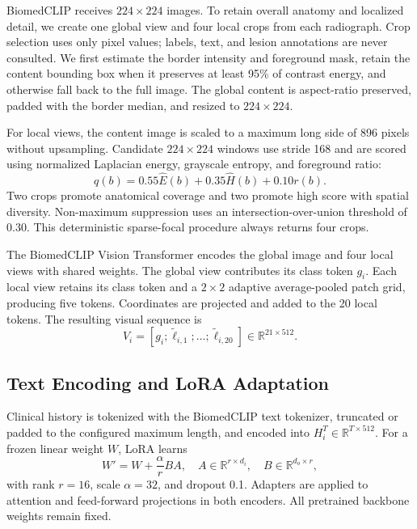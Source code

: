 \documentclass[runningheads]{llncs}
\begin{document}
BiomedCLIP receives $224\times224$ images. To retain overall anatomy and localized detail, we create one global view and four local crops from each radiograph. Crop selection uses only pixel values; labels, text, and lesion annotations are never consulted. We first estimate the border intensity and foreground mask, retain the content bounding box when it preserves at least 95\% of contrast energy, and otherwise fall back to the full image. The global content is aspect-ratio preserved, padded with the border median, and resized to $224\times224$.

For local views, the content image is scaled to a maximum long side of 896 pixels without upsampling. Candidate $224\times224$ windows use stride 168 and are scored using normalized Laplacian energy, grayscale entropy, and foreground ratio:
\begin{equation}
q(b)=0.55\widehat{E}(b)+0.35\widehat{H}(b)+0.10r(b).
\end{equation}
Two crops promote anatomical coverage and two promote high score with spatial diversity. Non-maximum suppression uses an intersection-over-union threshold of 0.30. This deterministic sparse-focal procedure always returns four crops.

The BiomedCLIP Vision Transformer \cite{Dosovitskiy2021ViT,BiomedCLIP} encodes the global image and four local views with shared weights. The global view contributes its class token $g_i$. Each local view retains its class token and a $2\times2$ adaptive average-pooled patch grid, producing five tokens. Coordinates are projected and added to the 20 local tokens. The resulting visual sequence is
\begin{equation}
V_i=[g_i;\tilde{\ell}_{i,1};\ldots;\tilde{\ell}_{i,20}]\in\mathbb{R}^{21\times512}.
\end{equation}

\subsection{Text Encoding and LoRA Adaptation}

Clinical history is tokenized with the BiomedCLIP text tokenizer, truncated or padded to the configured maximum length, and encoded into $H_i^T\in\mathbb{R}^{T\times512}$. For a frozen linear weight $W$, LoRA learns
\begin{equation}
W'=W+\frac{\alpha}{r}BA,
\quad A\in\mathbb{R}^{r\times d_i},\quad B\in\mathbb{R}^{d_o\times r},
\end{equation}
with rank $r=16$, scale $\alpha=32$, and dropout 0.1. Adapters are applied to attention and feed-forward projections in both encoders. All pretrained backbone weights remain fixed.
\end{document}
